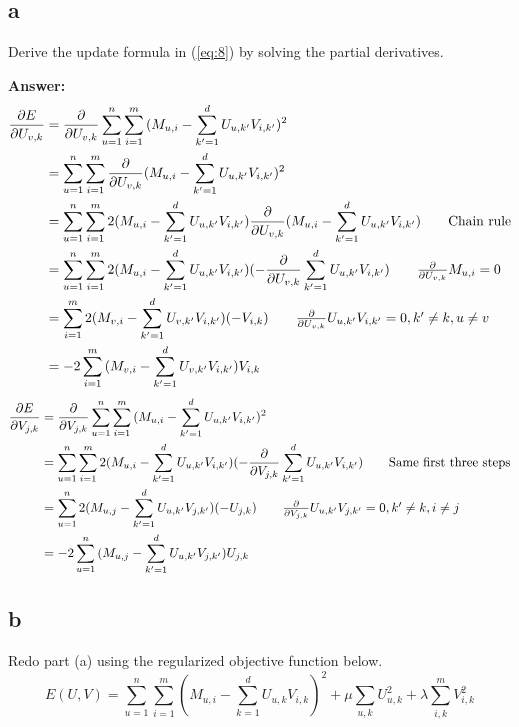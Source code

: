 \documentclass{article}
\begin{document}
\subsection{a}
Derive the update formula in (\ref{eq:8}) by solving the partial derivatives.

\textbf{Answer:}
\begin{align*}
    \frac{\partial E}{\partial U_{v,k}} &= \frac{\partial}{\partial U_{v,k}}\sum_{u=1}^n\sum_{i=1}^m{(M_{u,i} - \sum_{k'=1}^d{U_{u,k'}V_{i,k'}})^2}\\
    &= \sum_{u=1}^n\sum_{i=1}^m{\frac{\partial}{\partial U_{v,k}}(M_{u,i} - \sum_{k'=1}^d{U_{u,k'}V_{i,k'}})^2}\\
    &= \sum_{u=1}^n\sum_{i=1}^m{2(M_{u,i} - \sum_{k'=1}^d{U_{u,k'}V_{i,k'}})\frac{\partial}{\partial U_{v,k}}(M_{u,i} - \sum_{k'=1}^d{U_{u,k'}V_{i,k'}})}\tag*{\text{Chain rule}}\\
    &= \sum_{u=1}^n\sum_{i=1}^m{2(M_{u,i} - \sum_{k'=1}^d{U_{u,k'}V_{i,k'}})(-\frac{\partial}{\partial U_{v,k}}\sum_{k'=1}^d{U_{u,k'}V_{i,k'}})}\tag*{$\frac{\partial}{\partial U_{v,k}}M_{u,i} = 0$}\\
    &= \sum_{i=1}^m{2(M_{v,i} - \sum_{k'=1}^d{U_{v,k'}V_{i,k'}})(-V_{i,k})}\tag*{$\frac{\partial}{\partial U_{v,k}}U_{u,k'}V_{i,k'} = 0, k' \neq k, u \neq v$}\\
    &= -2\sum_{i=1}^m{(M_{v,i} - \sum_{k'=1}^d{U_{v,k'}V_{i,k'}})V_{i,k}}
\end{align*}
\begin{align*}
    \frac{\partial E}{\partial V_{j,k}} &= \frac{\partial}{\partial V_{j,k}}\sum_{u=1}^n\sum_{i=1}^m{(M_{u,i} - \sum_{k'=1}^d{U_{u,k'}V_{i,k'}})^2}\\
    &= \sum_{u=1}^n\sum_{i=1}^m{2(M_{u,i} - \sum_{k'=1}^d{U_{u,k'}V_{i,k'}})(-\frac{\partial}{\partial V_{j,k}}\sum_{k'=1}^d{U_{u,k'}V_{i,k'}})}\tag*{\text{Same first three steps}}\\
    &= \sum_{u=1}^n{2(M_{u,j} - \sum_{k'=1}^d{U_{u,k'}V_{j,k'}})(-U_{j,k})}\tag*{\text{$\frac{\partial}{\partial V_{j,k}}U_{u,k'}V_{j,k'} = 0, k' \neq k, i \neq j$}}\\
    &= -2\sum_{u=1}^n{(M_{u,j} - \sum_{k'=1}^d{U_{u,k'}V_{j,k'}})U_{j,k}}
\end{align*}

\subsection{b}
Redo part (a) using the regularized objective function below. 
$$E(U,V) = \sum_{u=1}^n\sum_{i=1}^m{(M_{u,i} - \sum_{k=1}^d{U_{u,k}V_{i,k}})^2} + \mu\sum_{u, k}{U_{u,k}^2} + \lambda\sum_{i,k}^m{V_{i,k}^2}$$
\end{document}

